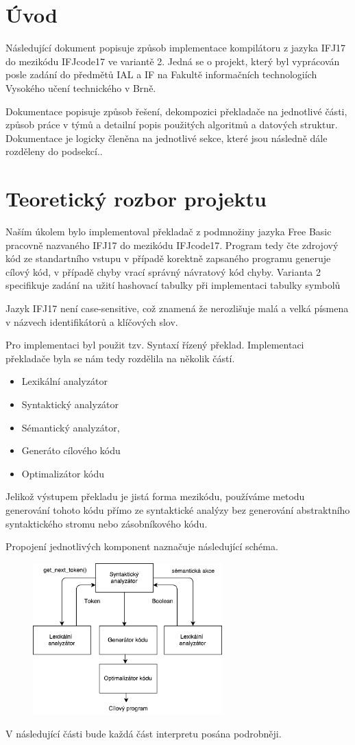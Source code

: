 \section{Úvod}
Následující dokument popisuje způsob implementace kompilátoru z jazyka IFJ17 do mezikódu
IFJcode17 ve variantě 2. Jedná se o projekt,
který byl vyprácován posle zadání do předmětů IAL a IF na Fakultě
informačních technologiích Vysokého učení technického v Brně.

Dokumentace popisuje způsob řešení, dekompozici překladače na jednotlivé části,
způsob práce v týmů a detailní popis použitých algoritmů a datových struktur. Dokumentace je logicky členěna na
jednotlivé sekce, které jsou následně dále rozděleny do podsekcí..

\section{Teoretický rozbor projektu}
Naším úkolem bylo implementoval překladač z podmnožiny jazyka Free Basic pracovně nazvaného
IFJ17 do mezikódu IFJcode17. Program tedy čte zdrojový kód ze standartního vstupu v případě korektně zapsaného
programu generuje cílový kód, v případě chyby vrací správný návratový kód chyby.
Varianta 2 specifikuje zadání na užití hashovací tabulky při implementaci tabulky symbolů

Jazyk IFJ17 není case-sensitive, což znamená že nerozlišuje malá a velká
písmena v názvech identifikátorů a klíčových slov.

Pro implementaci byl použit tzv. Syntaxí řízený překlad.
Implementaci překladače byla se nám tedy rozdělila na několik částí.

\begin{itemize}
    \item Lexikální analyzátor
    \item Syntaktický analyzátor
    \item Sémantický analyzátor,
    \item Generáto cílového kódu
    \item Optimalizátor kódu
\end{itemize}

Jelikož výstupem překladu je jistá forma mezikódu, používáme metodu generování tohoto kódu přímo ze syntaktické
analýzy bez generování abstraktního syntaktického stromu nebo zásobníkového kódu.

Propojení jednotlivých komponent naznačuje následující schéma.
\vspace*{16px}
\begin{figure}[htbp]
\centering
\includegraphics[width=0.65\textwidth, angle=0]{src/assets/structure.pdf}
\end{figure}

V následující části bude každá část interpretu posána podrobněji.